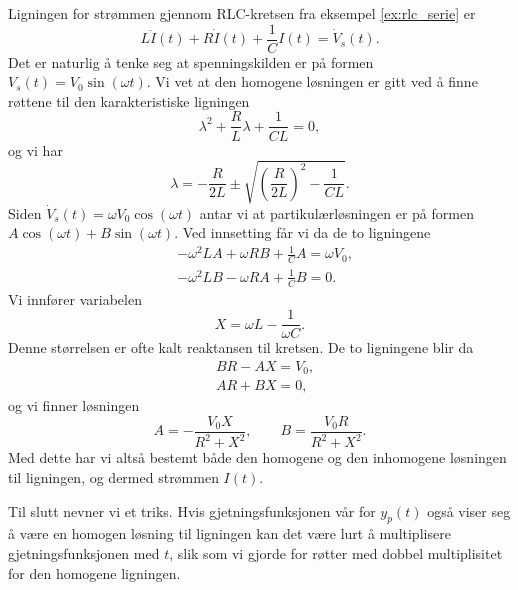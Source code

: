 \documentclass{article}
\theoremstyle{definition}
\newenvironment{ex}
{\pushQED{\qed}\renewcommand{\qedsymbol}{$\triangle$}\exx}
{\popQED\endexx}
\theoremstyle{remark}
\begin{document}
\begin{multicols*}{2}
\begin{ex}
  Ligningen for strømmen gjennom RLC-kretsen fra eksempel \ref{ex:rlc_serie} er
  \begin{equation*}
    L \ddot{I}(t) + R \dot{I}(t) + \frac{1}{C} I(t) = \dot{V}_s(t).
  \end{equation*}
  Det er naturlig å tenke seg at spenningskilden er på formen $V_s(t) = V_0 \sin(\omega t)$. Vi vet at den homogene løsningen er gitt ved å finne røttene til den karakteristiske ligningen
  \begin{equation*}
    \lambda^2 + \frac{R}{L} \lambda + \frac{1}{CL} = 0,
  \end{equation*}
  og vi har 
  \begin{equation*}
    \lambda = -\frac{R}{2L} \pm \sqrt{\left(\frac{R}{2L}\right)^2 - \frac{1}{CL}}.  
  \end{equation*}
  Siden $\dot{V}_s(t) = \omega V_0 \cos(\omega t)$ antar vi at partikulærløsningen er på formen $A \cos(\omega t) + B\sin(\omega t)$. Ved innsetting får vi da de to ligningene
  \begin{equation*}
    \begin{split}
      & - \omega^2 L A + \omega R B + \frac{1}{C} A = \omega V_0, \\
      & - \omega^2 L B - \omega R A + \frac{1}{C} B = 0.
    \end{split}
  \end{equation*}
  Vi innfører variabelen
  \begin{equation*}
    X = \omega L - \frac{1}{\omega C}.
  \end{equation*}
  Denne størrelsen er ofte kalt reaktansen til kretsen. De to ligningene blir da
  \begin{equation*}
    \begin{split}
      & BR - AX = V_0, \\
      & AR + BX = 0,
    \end{split}
  \end{equation*}
  og vi finner løsningen
  \begin{equation*}
    A = -\frac{V_0 X}{R^2 + X^2}, \qquad B = \frac{V_0 R}{R^2 + X^2}.
  \end{equation*}
  Med dette har vi altså bestemt både den homogene og den inhomogene løsningen til ligningen, og dermed strømmen $I(t)$.
\end{ex}

Til slutt nevner vi et triks. Hvis gjetningsfunksjonen vår for $y_p(t)$ også viser seg å være en homogen løsning til ligningen kan det være lurt å multiplisere gjetningsfunksjonen med $t$, slik som vi gjorde for røtter med dobbel multiplisitet for den homogene ligningen.


\end{multicols*}
\end{document}
